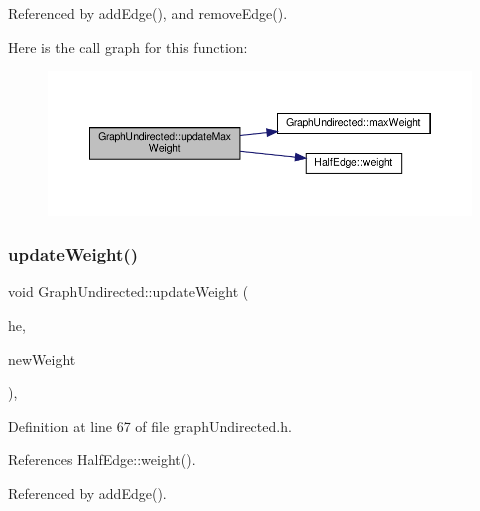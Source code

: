 Referenced by add\+Edge(), and remove\+Edge().

Here is the call graph for this function\+:
\nopagebreak
\begin{figure}[H]
\begin{center}
\leavevmode
\includegraphics[width=350pt]{classGraphUndirected_a10582b249617c876bdf298f675285960_cgraph}
\end{center}
\end{figure}
\mbox{\label{classGraphUndirected_aba42cbb7de421af5452f50025154ec73}} 
\subsubsection{\texorpdfstring{update\+Weight()}{updateWeight()}}
{\footnotesize\ttfamily void Graph\+Undirected\+::update\+Weight (\begin{DoxyParamCaption}\item[{\hyperlink{classHalfEdge}{Half\+Edge} \&}]{he,  }\item[{const \hyperlink{edge_8h_a2e7ea3be891ac8b52f749ec73fee6dd2}{type\+Weight} \&}]{new\+Weight }\end{DoxyParamCaption})\hspace{0.3cm}{\ttfamily [inline]}, {\ttfamily [private]}}



Definition at line 67 of file graph\+Undirected.\+h.



References Half\+Edge\+::weight().



Referenced by add\+Edge().

